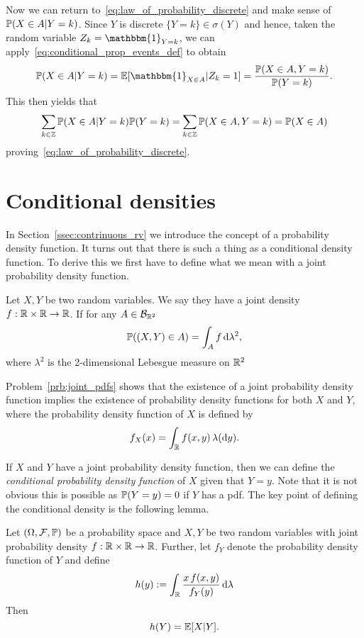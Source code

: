 Now we can return to~\eqref{eq:law_of_probability_discrete} and make sense of $\mathbb P(X \in A | Y = k)$. Since $Y$ is discrete $\{Y = k\} \in \sigma(Y)$ and hence, taken the random variable $Z_k = \mathbbm{1}_{Y = k}$, we can apply~\ref{eq:conditional_prop_events_def} to obtain 
\[
	\bbP(X \in A | Y = k) = \bbE[\mathbbm{1}_{X \in A} | Z_k = 1]
	= \frac{\bbP(X \in A, Y = k)}{\bbP(Y = k)}.
\]
This then yields that
\[
	\sum_{k \in \mathbb{Z}} \mathbb P(X \in A | Y = k) \mathbb P(Y = k) 
	= \sum_{k \in \mathbb{Z}} \mathbb P(X \in A, Y = k) = \mathbb P(X \in A)
\]
proving~\eqref{eq:law_of_probability_discrete}.

\section{Conditional densities}

In Section~\ref{ssec:contrinuous_rv} we introduce the concept of a probability density function. It turns out that there is such a thing as a conditional density function. To derive this we first have to define what we mean with a joint probability density function.

\begin{definition}\label{def:joint_pdf}
Let $X,Y$ be two random variables. We say they have a joint density $f : \mathbb R \times \mathbb R \to \mathbb R$. If for any $A \in \mathcal B_{\mathbb R^2}$
\[
	\mathbb P((X,Y) \in A) = \int_A f \, \mathrm{d} \lambda^2,
\]
where $\lambda^2$ is the 2-dimensional Lebesgue measure on $\mathbb R^2$
\end{definition}

Problem~\ref{prb:joint_pdfs} shows that the existence of a joint probability density function implies the existence of probability density functions for both $X$ and $Y$, where the probability density function of $X$ is defined by
\[
	f_X(x) = \int_{\mathbb R} f(x,y) \, \lambda(\mathrm{d} y).
\] 

If $X$ and $Y$ have a joint probability density function, then we can define the \emph{conditional probability density function} of $X$ given that $Y = y$. Note that it is not obvious this is possible as $\mathbb P(Y = y) = 0$ if $Y$ has a pdf. The key point of defining the conditional density is the following lemma.


\begin{lemma}\label{lem:condition_expectation_Y_y}
Let $(\Omega, \mathcal F, \mathbb P)$ be a probability space and $X,Y$ be two random variables with joint probability density $f : \mathbb R \times \mathbb R \to \mathbb R$. Further, let $f_Y$ denote the probability density function of $Y$ and define
\[
	h(y) := \int_{\mathbb R} \frac{x \, f(x,y)}{f_Y(y)} \, \mathrm{d} \lambda
\]
Then
\[
	h(Y) = \mathbb E[X | Y].
\]
\end{lemma}


